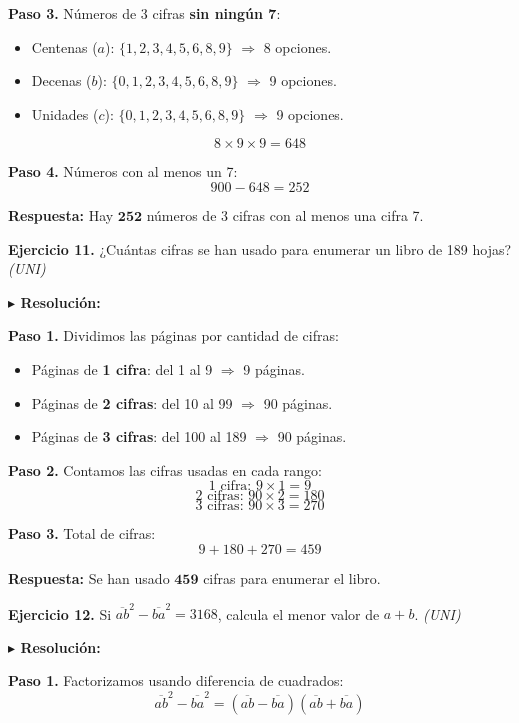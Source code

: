 \documentclass[10pt]{article}
\newcommand{\ejercicio}[2]{%
  \begin{enuncbox}
    \textbf{\textcolor{enunciado}{Ejercicio #1.}} #2
  \end{enuncbox}
}
\newcommand{\resolucion}{\vspace{2pt}\textbf{\textcolor{resolucion}{$\blacktriangleright$ Resolución:}}\vspace{4pt}}
\newcommand{\respuesta}[1]{%
  \begin{respbox}
    \textbf{\textcolor{respuesta}{Respuesta:}} #1
  \end{respbox}
}
\begin{document}
\textbf{Paso 3.} Números de 3 cifras \textbf{sin ningún 7}:
\begin{itemize}[itemsep=2pt]
    \item Centenas ($a$): $\{1,2,3,4,5,6,8,9\}$ $\Rightarrow$ 8 opciones.
    \item Decenas ($b$): $\{0,1,2,3,4,5,6,8,9\}$ $\Rightarrow$ 9 opciones.
    \item Unidades ($c$): $\{0,1,2,3,4,5,6,8,9\}$ $\Rightarrow$ 9 opciones.
\end{itemize}
\[
    8 \times 9 \times 9 = 648
\]

\textbf{Paso 4.} Números con al menos un 7:
\[
    900 - 648 = 252
\]

\respuesta{Hay $\mathbf{252}$ números de 3 cifras con al menos una cifra 7.}

\ejercicio{11}{¿Cuántas cifras se han usado para enumerar un libro de 189 hojas? \hfill \textit{(UNI)}}

\resolucion

\textbf{Paso 1.} Dividimos las páginas por cantidad de cifras:
\begin{itemize}[itemsep=2pt]
    \item Páginas de \textbf{1 cifra}: del 1 al 9 $\Rightarrow$ 9 páginas.
    \item Páginas de \textbf{2 cifras}: del 10 al 99 $\Rightarrow$ 90 páginas.
    \item Páginas de \textbf{3 cifras}: del 100 al 189 $\Rightarrow$ 90 páginas.
\end{itemize}

\textbf{Paso 2.} Contamos las cifras usadas en cada rango:
\[
    \text{1 cifra: } 9 \times 1 = 9
\]
\[
    \text{2 cifras: } 90 \times 2 = 180
\]
\[
    \text{3 cifras: } 90 \times 3 = 270
\]

\textbf{Paso 3.} Total de cifras:
\[
    9 + 180 + 270 = 459
\]

\respuesta{Se han usado $\mathbf{459}$ cifras para enumerar el libro.}

\ejercicio{12}{Si $\overline{ab}^2 - \overline{ba}^2 = 3168$, calcula el menor valor de $a + b$. \hfill \textit{(UNI)}}

\resolucion

\textbf{Paso 1.} Factorizamos usando diferencia de cuadrados:
\[
    \overline{ab}^2 - \overline{ba}^2 = \left(\overline{ab} - \overline{ba}\right)\left(\overline{ab} + \overline{ba}\right)
\]
\end{document}
